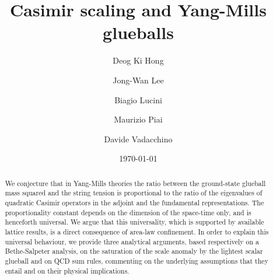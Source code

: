 \documentclass[prl,aps,
showpacs,
preprint,
nofootinbib,
floatfix,
superscriptaddress, showkeys
]{revtex4-1}
\begin{document}
\title{Casimir scaling and Yang-Mills glueballs}

\author{Deog Ki Hong}
  
           
             \author{Jong-Wan Lee}

\author{Biagio Lucini}


\author{Maurizio Piai}


\author{Davide Vadacchino}

\date{\today}

\begin{abstract}
We conjecture that in Yang-Mills theories the ratio between the
ground-state glueball mass squared and the string tension is
proportional to the ratio of the eigenvalues of quadratic Casimir
operators in the adjoint and the fundamental representations. The
proportionality constant depends on the dimension of the space-time
only, and is henceforth universal. We argue that this universality,
which is supported by available lattice results, is a direct consequence
of area-law confinement. In order to explain this universal
behaviour, we provide three analytical arguments, based respectively on
a Bethe-Salpeter analysis, on the saturation of the scale anomaly by the
lightest scalar glueball and on QCD sum rules, commenting on the
underlying assumptions that they entail and on their physical implications. 
\end{abstract}
\end{document}
